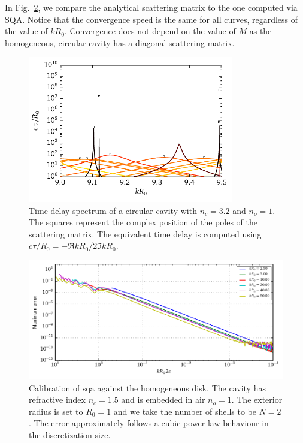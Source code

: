 In Fig.~\ref{fig:passive.numerical.convergenceHomogeneousDisk}, we compare the analytical scattering
matrix to the one computed via SQA. Notice that the convergence speed is the same for all curves, 
regardless of the value of $kR_0$. Convergence does not depend on the value of $M$
as the homogeneous, circular cavity has a diagonal scattering matrix. 

\begin{figure}
  \centering
  \includegraphics[width=0.8\textwidth]{figs/passive/correspondanceRootsPeaks.pdf}
  \caption[Correspondence between the poles of the scattering matrix and the peaks
	  of the time delay spectrum.]
	  {Time delay spectrum of a circular cavity with $n_c=3.2$ and $n_o=1$. The squares
	  represent the complex position of the poles of the scattering matrix. The equivalent
	  time delay is computed using $c\tau/R_0=-\Re{kR_0}/2\Im{kR_0}$.}
  \label{fig:passive.numerical.correspondanceRoots}
\end{figure}


\begin{figure}
 \centering
 \includegraphics{figs/passive/convergenceHomo.pdf}
 \caption[Convergence properties of SQA when applied on the homogeneous disk]
	  {Calibration of \gls{sqa} against the homogeneous disk. The cavity 
	  has refractive index $n_c=1.5$ and is embedded in air $n_o=1$. The exterior
	  radius is set to $R_0=1$ and we take the number of shells to be $N=2$.
	  The error approximately follows a cubic power-law behaviour in the discretization
	  size.}
 \label{fig:passive.numerical.convergenceHomogeneousDisk}
\end{figure}

